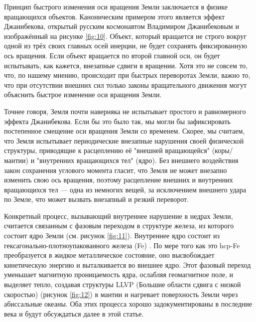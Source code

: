 \documentclass[10pt,twocolumn,letterpaper]{article}
\begin{document}
Принцип быстрого изменения оси вращения Земли заключается в физике вращающихся объектов. Каноническим примером этого является эффект Джанибекова, открытый русским космонавтом Владимиром Джанибековым \cite{37} и изображённый на рисунке \ref{fig:10}. Объект, который вращается не строго вокруг одной из трёх своих главных осей инерции, не будет сохранять фиксированную ось вращения. Если объект вращается по второй главной оси, он будет испытывать, как кажется, внезапные сдвиги в вращении. Хотя это не совсем то, что, по нашему мнению, происходит при быстрых переворотах Земли, важно то, что при отсутствии внешних сил только законы вращательного движения могут объяснить быстрое изменение оси вращения Земли.

Точнее говоря, Земля почти наверняка не испытывает простого и равномерного эффекта Джанибекова. Если бы это было так, мы могли бы зафиксировать постепенное смещение оси вращения Земли со временем. Скорее, мы считаем, что Земля испытывает периодические внезапные нарушения своей физической структуры, приводящие к расцеплению её "внешней вращающейся" (коры/мантии) и "внутренних вращающихся тел" (ядро). Без внешнего воздействия закон сохранения углового момента гласит, что Земля не может внезапно изменить свою ось вращения, поэтому расцепление внешних и внутренних вращающихся тел — одна из немногих вещей, за исключением внешнего удара по Земле, что может вызвать внезапный и резкий переворот.

Конкретный процесс, вызывающий внутреннее нарушение в недрах Земли, считается связанным с фазовым переходом в структуре железа, из которого состоит ядро Земли (см. рисунок \ref{fig:11}). Внутреннее ядро состоит из гексагонально-плотноупакованного железа (Fe) \cite{141}. По мере того как это hcp-Fe преобразуется в жидкое металлическое состояние, оно высвобождает кинетическую энергию и выталкивается во внешнее ядро. Этот фазовый переход уменьшает магнитную проницаемость ядра, ослабляя геомагнитное поле, и выделяет тепло, создавая структуры LLVP (Большие области сдвига с низкой скоростью) (рисунок \ref{fig:12}) \cite{38} в мантии и нагревает поверхность Земли через абиссальные океаны. Оба этих процесса хорошо задокументированы в последние века и будут обсуждаться далее в этой статье.
\end{document}
